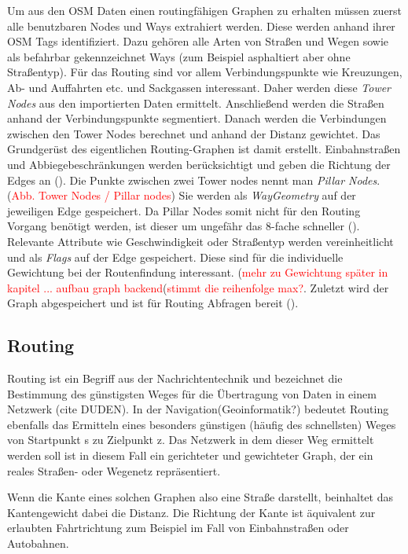 \documentclass[10pt,a4paper]{article}
\newcommand\todo[1]{\textcolor{red}{#1}}
\begin{document}
Um aus den OSM Daten einen routingfähigen Graphen zu erhalten müssen zuerst alle benutzbaren Nodes und Ways extrahiert werden. Diese werden anhand ihrer OSM Tags identifiziert. Dazu gehören alle Arten von Straßen und Wegen sowie als befahrbar gekennzeichnet Ways (zum Beispiel asphaltiert aber ohne Straßentyp). Für das Routing sind vor allem Verbindungspunkte wie Kreuzungen, Ab- und Auffahrten etc. und Sackgassen interessant. Daher werden diese \textit{Tower Nodes} aus den importierten Daten ermittelt. Anschließend werden die Straßen anhand der Verbindungspunkte segmentiert. Danach werden die Verbindungen zwischen den Tower Nodes berechnet und anhand der Distanz gewichtet. Das Grundgerüst des eigentlichen Routing-Graphen ist damit erstellt. Einbahnstraßen und Abbiegebeschränkungen werden berücksichtigt und geben die Richtung der Edges an (\cite{osmgraph}). Die Punkte zwischen zwei Tower nodes nennt man \textit{Pillar Nodes}.(\todo{Abb. Tower Nodes / Pillar nodes}) Sie werden als \textit{WayGeometry} auf der jeweiligen Edge gespeichert. Da Pillar Nodes somit nicht für den Routing Vorgang benötigt werden, ist dieser um ungefähr das 8-fache schneller (\cite{graphhopper}). Relevante Attribute wie Geschwindigkeit oder Straßentyp werden vereinheitlicht und als \textit{Flags} auf der Edge gespeichert. Diese sind für die individuelle Gewichtung bei der Routenfindung interessant.  (\todo{mehr zu Gewichtung später in kapitel ... aufbau graph backend}(\todo{stimmt die reihenfolge max?}. Zuletzt wird der Graph abgespeichert und ist für Routing Abfragen bereit (\cite{osmgraph}). 

\subsection{Routing}

Routing ist ein Begriff aus der Nachrichtentechnik und bezeichnet die Bestimmung des günstigsten Weges für die Übertragung von Daten in einem Netzwerk (cite DUDEN). In der Navigation(Geoinformatik?) bedeutet Routing ebenfalls das Ermitteln eines besonders günstigen (häufig des schnellsten) Weges von Startpunkt s zu Zielpunkt z.
Das Netzwerk in dem dieser Weg ermittelt werden soll ist in diesem Fall ein gerichteter und gewichteter Graph, der ein reales Straßen- oder Wegenetz repräsentiert.

Wenn die Kante eines solchen Graphen also eine Straße darstellt, beinhaltet das Kantengewicht dabei die Distanz. Die Richtung der Kante ist äquivalent zur erlaubten Fahrtrichtung zum Beispiel im Fall von Einbahnstraßen oder Autobahnen.
\end{document}
